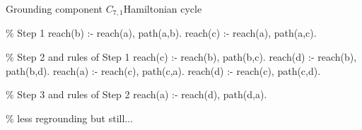 \begin{frame}{Grounding component \(C_{7,1}\)}{Hamiltonian cycle}
\begin{SemiVerbatim}{.9}
{\color{comment}\% Step 1}
reach(b) :- \alert{reach(a)}, \alert{path(a,b)}.
reach(c) :- \alert{reach(a)}, \alert{path(a,c)}.

{\color{comment}\% Step 2 \alert{and} rules of Step 1}
reach(c) :- \alert{reach(b)}, path(b,c).
reach(d) :- \alert{reach(b)}, path(b,d).
reach(a) :- \alert{reach(c)}, path(c,a).
reach(d) :- \alert{reach(c)}, path(c,d).

{\color{comment}\% Step 3 \alert{and} rules of Step 2}
reach(a) :- \alert{reach(d)}, path(d,a).

{\color{comment}\% less regrounding but still...}
\end{SemiVerbatim}
\end{frame}
%
